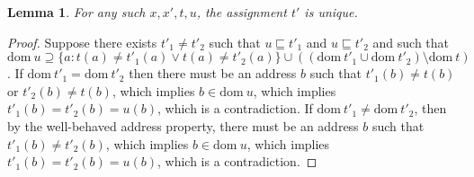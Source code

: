 \documentclass{article}
\newtheorem{lemma}[theorem]{Lemma}
\newcommand{\dom}[1]{\mbox{dom}{~#1}}
\newcommand{\contained}[0]{\sqsubseteq}
\begin{document}
\begin{lemma} \label{lemma:force-update-unique}
For any such $x, x', t, u$, the assignment $t'$ is unique.
\end{lemma}
\begin{proof}
Suppose there exists $t'_1 \ne t'_2$ such that $u \contained t'_1$ and $u \contained t'_2$ and such that $\dom{u} \supseteq \{a : t(a) \ne t'_1(a) \lor t(a) \ne t'_2(a)\} \cup ((\dom{t'_1} \cup \dom{t'_2}) \setminus \dom{t})$.
If $\dom{t'_1} = \dom{t'_2}$ then there must be an address $b$ such that $t'_1(b) \ne t(b)$ or $t'_2(b) \ne t(b)$, which implies $b \in \dom{u}$, which implies $t'_1(b) = t'_2(b) = u(b)$, which is a contradiction.
If $\dom{t'_1} \ne \dom{t'_2}$, then by the well-behaved address property, there must be an address $b$ such that $t'_1(b) \ne t'_2(b)$, which implies $b \in \dom{u}$, which implies $t'_1(b) = t'_2(b) = u(b)$, which is a contradiction.
\end{proof}
\end{document}
